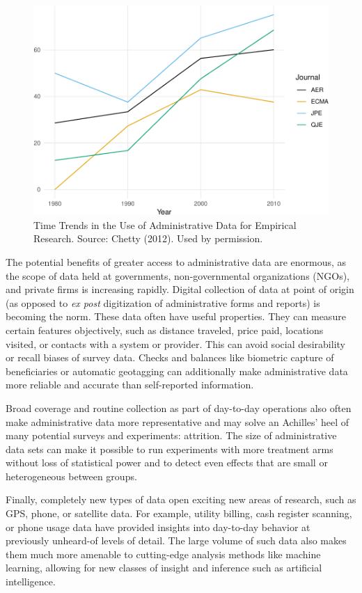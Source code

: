 \documentclass[
]{WileySix}
\begin{document}
\begin{figure}
\centering
\includegraphics{figures/introchetty-1.pdf}
\caption{\label{fig:introchetty}Time Trends in the Use of Administrative Data for Empirical Research. Source: Chetty (2012). Used by permission.}
\end{figure}

The potential benefits of greater access to administrative data are enormous, as the scope of data held at governments, non-governmental organizations (NGOs), and private firms is increasing rapidly. Digital collection of data at point of origin (as opposed to \emph{ex post} digitization of administrative forms and reports) is becoming the norm. These data often have useful properties. They can measure certain features objectively, such as distance traveled, price paid, locations visited, or contacts with a system or provider. This can avoid social desirability or recall biases of survey data. Checks and balances like biometric capture of beneficiaries or automatic geotagging can additionally make administrative data more reliable and accurate than self-reported information.

Broad coverage and routine collection as part of day-to-day operations also often make administrative data more representative and may solve an Achilles' heel of many potential surveys and experiments: attrition. The size of administrative data sets can make it possible to run experiments with more treatment arms without loss of statistical power and to detect even effects that are small or heterogeneous between groups.

Finally, completely new types of data open exciting new areas of research, such as GPS, phone, or satellite data. For example, utility billing, cash register scanning, or phone usage data have provided insights into day-to-day behavior at previously unheard-of levels of detail. The large volume of such data also makes them much more amenable to cutting-edge analysis methods like machine learning, allowing for new classes of insight and inference such as artificial intelligence.
\end{document}
